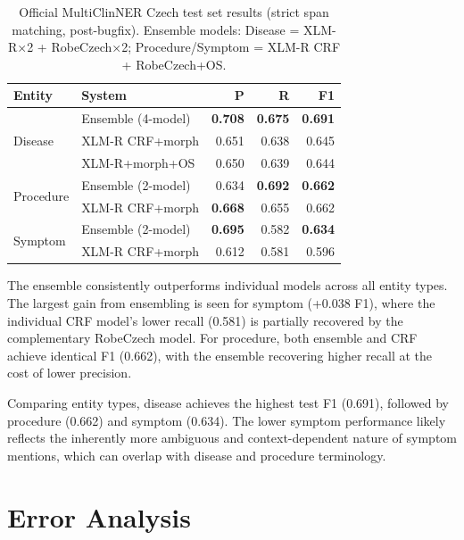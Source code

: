 \documentclass[11pt]{article}
\begin{document}
\begin{table}[h]
\centering
\small
\begin{tabular}{llrrr}
\toprule
\textbf{Entity} & \textbf{System} & \textbf{P} & \textbf{R} & \textbf{F1} \\
\midrule
\multirow{3}{*}{Disease}
  & Ensemble (4-model) & \textbf{0.708} & \textbf{0.675} & \textbf{0.691} \\
  & XLM-R CRF+morph    & 0.651          & 0.638          & 0.645 \\
  & XLM-R+morph+OS     & 0.650          & 0.639          & 0.644 \\
\midrule
\multirow{2}{*}{Procedure}
  & Ensemble (2-model) & 0.634 & \textbf{0.692} & \textbf{0.662} \\
  & XLM-R CRF+morph    & \textbf{0.668} & 0.655          & 0.662 \\
\midrule
\multirow{2}{*}{Symptom}
  & Ensemble (2-model) & \textbf{0.695} & 0.582 & \textbf{0.634} \\
  & XLM-R CRF+morph    & 0.612          & 0.581 & 0.596 \\
\bottomrule
\end{tabular}
\caption{Official MultiClinNER Czech test set results (strict span matching, post-bugfix).
Ensemble models: Disease = XLM-R×2 + RobeCzech×2; Procedure/Symptom = XLM-R CRF + RobeCzech+OS.}
\label{tab:test}
\end{table}

The ensemble consistently outperforms individual models across all entity types. The
largest gain from ensembling is seen for symptom (+0.038 F1), where the individual CRF
model's lower recall (0.581) is partially recovered by the complementary RobeCzech model.
For procedure, both ensemble and CRF achieve identical F1 (0.662), with the ensemble
recovering higher recall at the cost of lower precision.

Comparing entity types, disease achieves the highest test F1 (0.691), followed by
procedure (0.662) and symptom (0.634). The lower symptom performance likely reflects
the inherently more ambiguous and context-dependent nature of symptom mentions, which
can overlap with disease and procedure terminology.

\section{Error Analysis}
\end{document}
